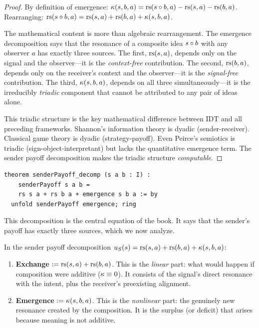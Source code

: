 \begin{proof}
By definition of emergence:
$\kappa(s, b, a) = \mathrm{rs}(s \circ b, a) - \mathrm{rs}(s, a) - \mathrm{rs}(b, a)$.
Rearranging: $\mathrm{rs}(s \circ b, a) = \mathrm{rs}(s, a) + \mathrm{rs}(b, a) + \kappa(s, b, a)$.

The mathematical content is more than algebraic rearrangement. The
emergence decomposition says that the resonance of a composite idea
$s \circ b$ with any observer $a$ has exactly three sources. The first,
$\mathrm{rs}(s, a)$, depends only on the signal and the observer---it is the
\emph{context-free} contribution. The second, $\mathrm{rs}(b, a)$, depends only on
the receiver's context and the observer---it is the \emph{signal-free}
contribution. The third, $\kappa(s, b, a)$, depends on all three
simultaneously---it is the irreducibly \emph{triadic} component that
cannot be attributed to any pair of ideas alone.

This triadic structure is the key mathematical difference between IDT and
all preceding frameworks. Shannon's information theory is dyadic (sender-receiver).
Classical game theory is dyadic (strategy-payoff). Even Peirce's semiotics is
triadic (sign-object-interpretant) but lacks the quantitative emergence term.
The sender payoff decomposition makes the triadic structure \emph{computable}.
\end{proof}

\begin{lstlisting}[caption={Lean 4: Sender payoff decomposition}]
theorem senderPayoff_decomp (s a b : I) :
    senderPayoff s a b =
    rs s a + rs b a + emergence s b a := by
  unfold senderPayoff emergence; ring
\end{lstlisting}

This decomposition is the central equation of the book. It says that the
sender's payoff has exactly three sources, which we now analyze.

\begin{definition}
\label{def:three-components}
In the sender payoff decomposition $u_S(s) = \mathrm{rs}(s,a) + \mathrm{rs}(b,a) + \kappa(s,b,a)$:
\begin{enumerate}
\item \textbf{Exchange} $:= \mathrm{rs}(s, a) + \mathrm{rs}(b, a)$. This is the
\emph{linear} part: what would happen if composition were additive
($\kappa \equiv 0$). It consists of the signal's direct resonance with the
intent, plus the receiver's preexisting alignment.
\item \textbf{Emergence} $:= \kappa(s, b, a)$. This is the \emph{nonlinear}
part: the genuinely new resonance created by the composition. It is the
surplus (or deficit) that arises because meaning is not additive.
\end{enumerate}
\end{definition}

